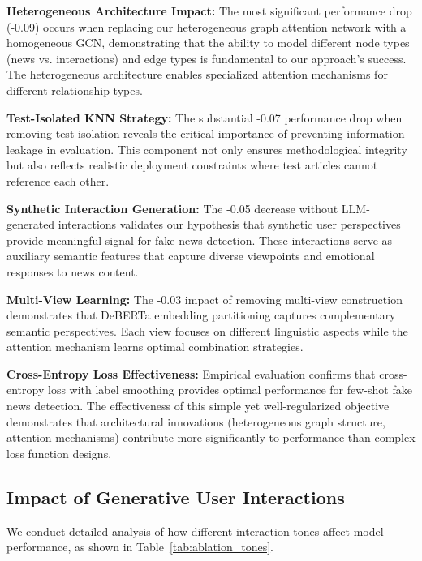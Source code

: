 \textbf{Heterogeneous Architecture Impact:} The most significant performance drop (-0.09) occurs when replacing our heterogeneous graph attention network with a homogeneous GCN, demonstrating that the ability to model different node types (news vs. interactions) and edge types is fundamental to our approach's success. The heterogeneous architecture enables specialized attention mechanisms for different relationship types.

\textbf{Test-Isolated KNN Strategy:} The substantial -0.07 performance drop when removing test isolation reveals the critical importance of preventing information leakage in evaluation. This component not only ensures methodological integrity but also reflects realistic deployment constraints where test articles cannot reference each other.

\textbf{Synthetic Interaction Generation:} The -0.05 decrease without LLM-generated interactions validates our hypothesis that synthetic user perspectives provide meaningful signal for fake news detection. These interactions serve as auxiliary semantic features that capture diverse viewpoints and emotional responses to news content.

\textbf{Multi-View Learning:} The -0.03 impact of removing multi-view construction demonstrates that DeBERTa embedding partitioning captures complementary semantic perspectives. Each view focuses on different linguistic aspects while the attention mechanism learns optimal combination strategies.

\textbf{Cross-Entropy Loss Effectiveness:} Empirical evaluation confirms that cross-entropy loss with label smoothing provides optimal performance for few-shot fake news detection. The effectiveness of this simple yet well-regularized objective demonstrates that architectural innovations (heterogeneous graph structure, attention mechanisms) contribute more significantly to performance than complex loss function designs.

\subsection{Impact of Generative User Interactions}

We conduct detailed analysis of how different interaction tones affect model performance, as shown in Table~\ref{tab:ablation_tones}.

